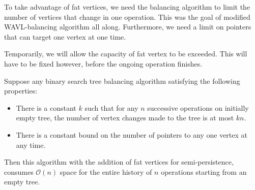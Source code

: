 To take advantage of fat vertices, we need the balancing algorithm to limit the number of vertices that change in one operation. This was the goal of modified WAVL-balancing algorithm all along. Furthermore, we need a limit on pointers that can target one vertex at one time.

Temporarily, we will allow the capacity of fat vertex to be exceeded. This will have to be fixed however, before the ongoing operation finishes.

\begin{prop}
Suppose any binary search tree balancing algorithm satisfying the following properties:
\begin{itemize}
\item 
There is a constant $k$ such that for any $n$ successive operations on initially empty tree, the number of vertex changes made to the tree is at most $kn$. 
\item 
There is a constant bound on the number of pointers to any one vertex at any time.
\end{itemize}
Then this algorithm with the addition of fat vertices for semi-persistence, consumes $\mathcal{O}(n)$ space for the entire history of $n$ operations starting from an empty tree.
\end{prop}

